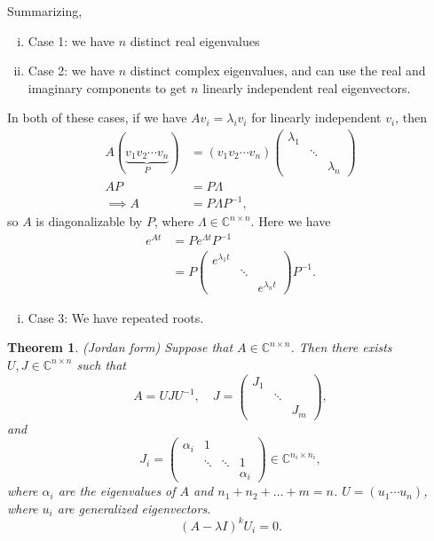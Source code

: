 \documentclass{tufte-handout}
\newtheorem{thm}{Theorem}[subsection]
\theoremstyle{definition}
\begin{document}
Summarizing,
\begin{enumerate}[(i)]
	\item Case 1: we have $n$ distinct real eigenvalues
	\item Case 2: we have $n$ distinct complex eigenvalues, and can use the real and imaginary components to get $n$ linearly independent real eigenvectors.
\end{enumerate}
In both of these cases, if we have $Av_i = \lambda_i v_i$ for linearly independent $v_i$, then
\begin{align*}
	A \left( \underbrace{v_1 v_2 \cdots v_n}_{P} \right) &= (v_1 v_2 \cdots v_n) \begin{pmatrix}
		\lambda_1 & &  \\
				  & \ddots & \\
				  & & \lambda_n
	\end{pmatrix} \\
		AP &= P\Lambda \\
		\implies A &= P\Lambda P^{-1}
,\end{align*}
so $A$ is diagonalizable by $P$, where $\Lambda \in \mathbb{C}^{n\times n}$.
Here we have
\begin{align*}
	e^{At} &= P e^{\Lambda t}P^{-1} \\
		   &= P \begin{pmatrix}
			   e^{\lambda_1 t} & &  \\
							   & \ddots & \\
							   & & e^{\lambda_n t}
		   \end{pmatrix} P^{-1}
.\end{align*}

\setcounter{enumi}{3}
\begin{enumerate}[(i)]
	\item Case 3: We have repeated roots.
\end{enumerate}
\begin{thm}
	(Jordan form) Suppose that $A \in \mathbb{C}^{n\times n}$. Then there exists $U,J \in \mathbb{C}^{n\times n}$ such that \[
		A = UJU^{-1}, \quad J = \begin{pmatrix}
			J_1 & & \\
				& \ddots & \\
				& &J_m
		\end{pmatrix}
	,\] and \[
		J_i = \begin{pmatrix}
			\alpha_i & 1 & & \\
					 & \ddots & \ddots & 1\\
					 & & & \alpha_i
		\end{pmatrix} \in \mathbb{C}^{n_i \times n_i}
	,\] where $\alpha_i$ are the eigenvalues of $A$ and $n_1+n_2+\ldots+m = n$. $U = \left( u_1 \cdots u_n \right)$, where $u_i$ are generalized eigenvectors. 
	\[
		\left( A - \lambda I \right)^{k}U_i = 0
	.\] 
\end{thm}
\end{document}
